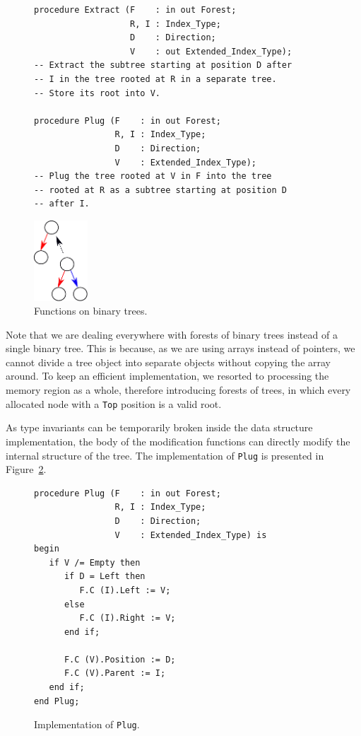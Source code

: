 \documentclass{llncs}
\begin{document}
\begin{figure}[ht]
\begin{minipage}[c]{.75\linewidth}
\begin{small}
\begin{lstlisting}
procedure Extract (F    : in out Forest;
                   R, I : Index_Type;
                   D    : Direction;
                   V    : out Extended_Index_Type);
-- Extract the subtree starting at position D after
-- I in the tree rooted at R in a separate tree.
-- Store its root into V.

procedure Plug (F    : in out Forest;
                R, I : Index_Type;
                D    : Direction;
                V    : Extended_Index_Type);
-- Plug the tree rooted at V in F into the tree
-- rooted at R as a subtree starting at position D
-- after I.
\end{lstlisting}
\end{small}
\end{minipage} \hfill
\begin{minipage}[c]{.23\linewidth}
\includegraphics[width=2cm]{plug.pdf}
\end{minipage}
\caption{\label{fig-binary-fun} Functions on binary trees.}
\end{figure}

Note that we are dealing everywhere with forests of binary trees instead of a single
binary tree. This is because, as we are using arrays instead of pointers, we cannot divide a
tree object into separate objects without copying the array around. To keep an efficient
implementation, we resorted to processing the memory region as a whole, therefore
introducing forests of trees, in which every allocated node with a \texttt{Top} position is a
valid root.

As type invariants can be temporarily broken inside the data structure implementation, the body
of the modification functions can directly modify the internal structure of the tree. The implementation
of \texttt{Plug} is presented in Figure~\ref{fig-binary-body}.

\begin{figure}[ht]
\begin{small}
\begin{lstlisting}
procedure Plug (F    : in out Forest;
                R, I : Index_Type;
                D    : Direction;
                V    : Extended_Index_Type) is
begin
   if V /= Empty then
      if D = Left then
         F.C (I).Left := V;
      else
         F.C (I).Right := V;
      end if;

      F.C (V).Position := D;
      F.C (V).Parent := I;
   end if;
end Plug;
\end{lstlisting}
\end{small}
\caption{\label{fig-binary-body} Implementation of \texttt{Plug}.}
\end{figure}
\end{document}
